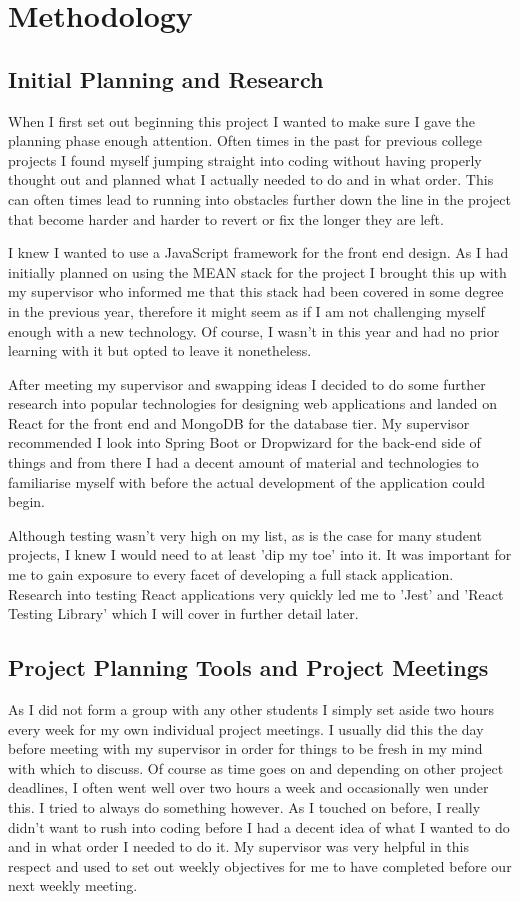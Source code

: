 \chapter{Methodology}
\section{Initial Planning and Research}
When I first set out beginning this project I wanted to make sure I gave the planning phase enough attention. Often times in the past for previous college projects I found myself jumping straight into coding without having properly thought out and planned what I actually needed to do and in what order. This can often times lead to running into obstacles further down the line in the project that become harder and harder to revert or fix the longer they are left.

I knew I wanted to use a JavaScript framework for the front end design. As I had initially planned on using the MEAN stack for the project I brought this up with my supervisor who informed me that this stack had been covered in some degree in the previous year, therefore it might seem as if I am not challenging myself enough with a new technology. Of course, I wasn't in this year and had no prior learning with it but opted to leave it nonetheless.

After meeting my supervisor and swapping ideas I decided to do some further research into popular technologies for designing web applications and landed on React for the front end and MongoDB for the database tier. My supervisor recommended I look into Spring Boot or Dropwizard for the back-end side of things and from there I had a decent amount of material and technologies to familiarise myself with before the actual development of the application could begin.

Although testing wasn't very high on my list, as is the case for many student projects, I knew I would need to at least 'dip my toe' into it. It was important for me to gain exposure to every facet of developing a full stack application. Research into testing React applications very quickly led me to 'Jest' and 'React Testing Library' which I will cover in further detail later.

\section{Project Planning Tools and Project  Meetings}
As I did not form a group with any other students I simply set aside two hours every week for my own individual project meetings. I usually did this the day before meeting with my supervisor in order for things to be fresh in my mind with which to discuss. Of course as time goes on and depending on other project deadlines, I often went well over two hours a week and occasionally wen under this. I tried to always do something however. As I touched on before, I really didn't want to rush into coding before I had a decent idea of what I wanted to do and in what order I needed to do it. My supervisor was very helpful in this respect and used to set out weekly objectives for me to have completed before our next weekly meeting.

